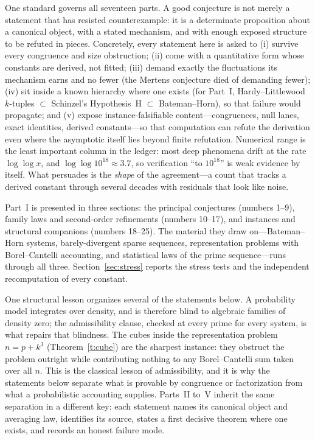 \documentclass[11pt]{article}
\theoremstyle{definition}
\begin{document}
One standard governs all seventeen parts.  A good conjecture is not merely a
statement that has resisted counterexample: it is a determinate
proposition about a canonical object, with a stated mechanism, and with
enough exposed structure to be refuted in pieces.  Concretely, every
statement here is asked to
(i) survive every congruence and size obstruction;
(ii) come with a quantitative form whose constants are derived, not
fitted;
(iii) demand exactly the fluctuations its mechanism earns and no fewer
(the Mertens conjecture died of demanding fewer);
(iv) sit inside a known hierarchy where one exists (for Part~I,
Hardy--Littlewood $k$-tuples $\subset$ Schinzel's Hypothesis~H
$\subset$ Bateman--Horn), so that failure would propagate; and
(v) expose instance-falsifiable content---congruences, null lanes, exact
identities, derived constants---so that computation can refute the
derivation even where the asymptotic itself lies beyond finite
refutation.
Numerical range is the least important column in the ledger: most deep
phenomena drift at the rate $\log\log x$, and $\log\log 10^{18}\approx
3.7$, so verification ``to $10^{18}$'' is weak evidence by itself.  What
persuades is the \emph{shape} of the agreement---a count that tracks a
derived constant through several decades with residuals that look like
noise.

Part~I is presented in three sections: the principal conjectures
(numbers 1--9), family laws and second-order refinements (numbers
10--17), and instances and structural companions (numbers 18--25).  The
material they draw on---Bateman--Horn systems, barely-divergent sparse
sequences, representation problems with Borel--Cantelli accounting, and
statistical laws of the prime sequence---runs through all three.
Section~\ref{sec:stress} reports the stress tests and the independent
recomputation of every constant.

One structural lesson organizes several of the statements below.  A
probability model integrates over density, and is therefore blind to
algebraic families of density zero; the admissibility clause, checked at
every prime for every system, is what repairs that blindness.  The cubes
inside the representation problem $n=p+k^3$ (Theorem~\ref{t:cube}) are
the sharpest instance: they obstruct the problem outright while
contributing nothing to any Borel--Cantelli sum taken over all $n$.
This is the classical lesson of admissibility, and it is why the
statements below separate what is provable by congruence or
factorization from what a probabilistic accounting supplies.  Parts~II to~V inherit the same separation in a different key: each statement
names its canonical object and averaging law, identifies its source,
states a first decisive theorem where one exists, and records an honest
failure mode.
\end{document}
